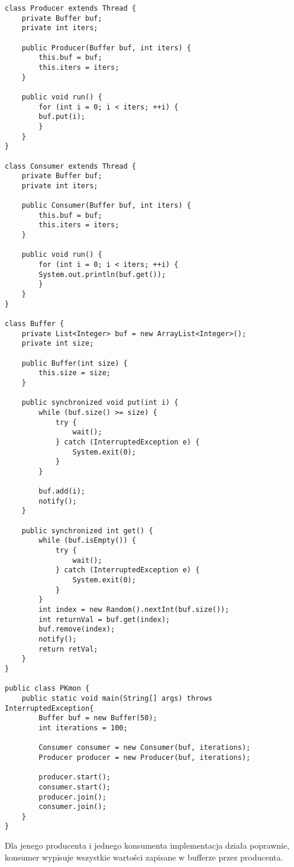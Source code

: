 \documentclass{article}
\begin{document}
\begin{verbatim}
class Producer extends Thread {
    private Buffer buf;
    private int iters;

    public Producer(Buffer buf, int iters) {
        this.buf = buf;
        this.iters = iters;
    }

    public void run() {
        for (int i = 0; i < iters; ++i) {
        buf.put(i);
        }
    }
}
        
class Consumer extends Thread {
    private Buffer buf;
    private int iters;

    public Consumer(Buffer buf, int iters) {
        this.buf = buf;
        this.iters = iters;
    }

    public void run() {
        for (int i = 0; i < iters; ++i) {
        System.out.println(buf.get());
        }
    }
}
        
class Buffer {
    private List<Integer> buf = new ArrayList<Integer>();
    private int size;

    public Buffer(int size) {
        this.size = size;
    }

    public synchronized void put(int i) {
        while (buf.size() >= size) {
            try {
                wait();
            } catch (InterruptedException e) {
                System.exit(0);
            }
        }

        buf.add(i);
        notify();
    }

    public synchronized int get() {
        while (buf.isEmpty()) {
            try {
                wait();
            } catch (InterruptedException e) {
                System.exit(0);
            }
        }
        int index = new Random().nextInt(buf.size());
        int returnVal = buf.get(index);
        buf.remove(index);
        notify();
        return retVal;
    }
}

public class PKmon {
    public static void main(String[] args) throws InterruptedException{
        Buffer buf = new Buffer(50);
        int iterations = 100;

        Consumer consumer = new Consumer(buf, iterations);
        Producer producer = new Producer(buf, iterations);

        producer.start();
        consumer.start();
        producer.join();
        consumer.join();
    }
}
\end{verbatim}

Dla jenego producenta i jednego konsumenta implementacja działa poprawnie, konsumer wypisuje
wszystkie wartości zapisane w bufferze przez producenta.
\end{document}
